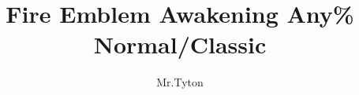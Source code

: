 \documentclass[a4paper]{report}
\title{Fire Emblem Awakening Any\% Normal/Classic}
\author{Mr.Tyton}
\begin{document}
\singlespacing
\maketitle
\makeatletter
\patchcmd{\chapter}{\if@openright\cleardoublepage\else\clearpage\fi}{}{}{}
\makeatother


\newenvironment{battlespecial}[1]{\begin{tcolorbox}[title=\begin{center}#1\end{center},colbacktitle=red!50!white]}{\end{tcolorbox}}
\newenvironment{battle}[1]{\refstepcounter{chaptercount} \begin{tcolorbox}[title=\begin{center}Chapter \thechaptercount\ - #1\end{center},colbacktitle=red!50!white]}{\end{tcolorbox}}


\newcommand{\battleinfo}[3]{Goal: \ifthenelse{\equal{#1}{rout}}{Rout the Enemy}{\ifthenelse{\equal{#1}{commander}}{Defeat the Commander}{#1}} \newline Turns: #2 \newline Units: #3}


\newenvironment{shop}[1]{\begin{tcolorbox}[title=\begin{center}SHOP\, #1 GOLD\end{center},colbacktitle=green!50!white]}{\end{tcolorbox}}

\newcommand{\cs}[1][]{\textbf{CS}%
	\ifthenelse{\isempty{#1}}{}{ (#1)}%
}


\newcommand{\robin}{\textbf{\textcolor{purple}{Robin}}}
\newcommand{\anna}{\textbf{\textcolor{green}{Anna}}}
\newcommand{\chrom}{\textbf{\textcolor{blue}{Chrom}}}
\newcommand{\lucina}{\textbf{\textcolor{cyan}{Lucina}}}
\newcommand{\frederick}{\textbf{\textcolor{gray}{Frederick}}}
\newcommand{\sully}{\textbf{\textcolor{BrickRed}{Sully}}}
\newcommand{\cordelia}{\textbf{\textcolor{Mahogany}{Cordelia}}}
\newcommand{\ricken}{\textbf{\textcolor{Emerald}{Ricken}}}
\newcommand{\nowi}{\textbf{\textcolor{SpringGreen}{Nowi}}}
\newcommand{\olivia}{\textbf{\textcolor{Magenta}{Olivia}}}
\newcommand{\cherche}{\textbf{\textcolor{Maroon}{Cherche}}}
\newcommand{\sayri}{\textbf{\textcolor{PineGreen}{Say'ri}}}
\newcommand{\basilio}{\textbf{\textcolor{brown}{Basilio}}}
\newcommand{\flavia}{\textbf{\textcolor{RawSienna}{Flavia}}}
\newcommand{\enemy}[1]{\textbf{\textcolor{red}{#1}}}
\end{document}
